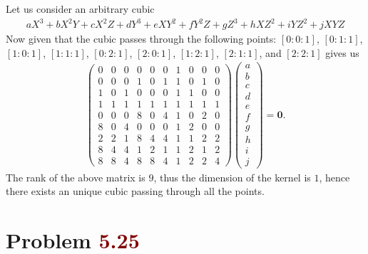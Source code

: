 \documentclass[12pt]{article}
\begin{document}
Let us consider an arbitrary cubic
\begin{align*}
   aX^3 + bX^2Y + cX^2Z + d Y^3 + e XY^2 + f Y^2 Z + g Z^3 + h XZ^2 + i YZ^2 + j XYZ
\end{align*}
Now given that the cubic passes through the following points: $[0 : 0 : 1]$, $[0 : 1 : 1]$, $[1 : 0 : 1]$, $[1 : 1 : 1]$, $[0 : 2 : 1]$, $[2 : 0 : 1]$, $[1 : 2 : 1]$, $[2 : 1 : 1]$, and $[2 : 2 : 1]$ gives us
\begin{align*}
   \begin{pmatrix}
      0 & 0 & 0 & 0 & 0 & 0 & 1 & 0 & 0 & 0 \\
      0 & 0 & 0 & 1 & 0 & 1 & 1 & 0 & 1 & 0 \\
      1 & 0 & 1 & 0 & 0 & 0 & 1 & 1 & 0 & 0 \\
      1 & 1 & 1 & 1 & 1 & 1 & 1 & 1 & 1 & 1 \\
      0 & 0 & 0 & 8 & 0 & 4 & 1 & 0 & 2 & 0 \\
      8 & 0 & 4 & 0 & 0 & 0 & 1 & 2 & 0 & 0 \\
      2 & 2 & 1 & 8 & 4 & 4 & 1 & 1 & 2 & 2 \\
      8 & 4 & 4 & 1 & 2 & 1 & 1 & 2 & 1 & 2 \\
      8 & 8 & 4 & 8 & 8 & 4 & 1 & 2 & 2 & 4
   \end{pmatrix}\begin{pmatrix}
                   a \\ b \\ c \\ d \\ e \\ f \\ g \\ h \\ i \\ j
                \end{pmatrix} = \mathbf{0}.
\end{align*}
The rank of the above matrix is $9$, thus the dimension of the kernel is $1$, hence there exists an unique cubic passing through all the points.

\section*{Problem \textcolor{maroon}{5.25}}
\end{document}
